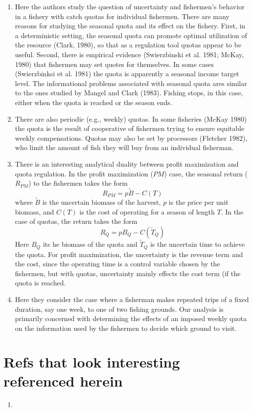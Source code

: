\documentclass[a4paper,11pt]{article}
\begin{document}
\begin{enumerate}
\item Here the authors study the question of uncertainty and fishermen's behavior in a fishery with catch quotas for individual fishermen. There are many reasons for studying the seasonal quota and its effect on the fishery. First, in a deterministic setting, the seasonal quota can promote optimal utilization of the resource (Clark, 1980), so that as a regulation tool quotas appear to be useful. Second, there is empirical evidence (Swierzbinski et al. 1981; McKay, 1980) that fishermen may set quotes for themselves. In some cases (Swierzbinksi et al. 1981) the quota is apparently a seasonal income target level. The informational problems associated with seasonal quota ares similar to the ones studied by Mangel and Clark (1983). Fishing stops, in this case, either when the quota is reached or the season ends. 
\item There are also periodic (e.g., weekly) quotas. In some fisheries (McKay 1980) the quota is the result of cooperative of fishermen trying to ensure equitable weekly compensations. Quotas may also be set by processors (Fletcher 1982), who limit the amount of fish they will buy from an individual fisherman. 
\item There is an interesting analytical duality between profit maximization and quota regulation. In the profit maximization ($PM$) case, the seasonal return ($R_{PM}$) to the fishermen takes the form 
\[R_{PM} = p\tilde{B} - C(T)\]
where $\tilde{B}$ is the uncertain biomass of the harvest, $p$ is the price per unit biomass, and $C(T)$ is the cost of operating for a season of length $T$. In the case of quotas, the return takes the form
\[R_Q = pB_Q - C(\tilde{T}_Q)\]
Here $B_Q$ its he biomass of the quota and $\tilde{T}_Q$ is the uncertain time to achieve the quota. For profit maximization, the uncertainty is the revenue term and the cost, since the operating time is  a control variable chosen by the fishermen, but with quotas, uncertainty mainly effects the cost term (if the quota is reached. 
\item Here they consider the case where a fisherman makes repeated trips of a fixed duration, say one week, to one of two fishing grounds. Our analysis is primarily concerned with determining the effects of an imposed weekly quota on the information used by the fishermen to decide which ground to visit. 
\end{enumerate}

\section*{Refs that look interesting referenced herein}
\begin{enumerate}
\item
\end{enumerate}




\end{document}

